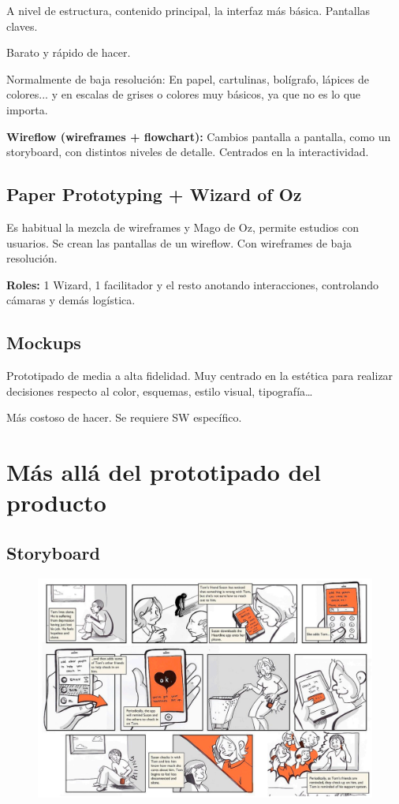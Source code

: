 \documentclass[12pt, twoside, openright]{report} %
\begin{document}
A nivel de estructura, contenido principal, la interfaz más básica.
Pantallas claves.

Barato y rápido de hacer.

Normalmente de baja resolución: En papel, cartulinas, bolígrafo, lápices de colores... y en escalas de grises o colores muy básicos, ya que no es lo que importa.

\textbf{Wireflow (wireframes + flowchart):} Cambios pantalla a pantalla, como un storyboard, con distintos niveles de detalle. Centrados en la interactividad.

\subsection{Paper Prototyping + Wizard of Oz}

Es habitual la mezcla de wireframes y Mago de Oz, permite estudios con usuarios.
Se crean las pantallas de un wireflow. Con wireframes de baja resolución.

\textbf{Roles:} 1 Wizard, 1 facilitador y el resto anotando interacciones, controlando cámaras y demás logística.

\subsection{Mockups}
Prototipado de media a alta fidelidad. Muy centrado en la estética para realizar decisiones respecto al color, esquemas, estilo visual, tipografía…

Más costoso de hacer. Se requiere SW específico.

\section{Más allá del prototipado del producto}
\subsection{Storyboard}

\begin{figure}[H]
	{\includegraphics[scale=.38]{2021-03-20 23_53_31-L5.pdf - Foxit Reader.png}}
\end{figure}
\end{document}
